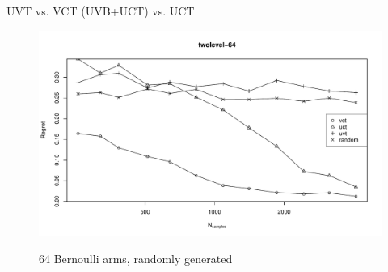 \documentclass{beamer}
\begin{document}
\begin{frame}{UVT vs. VCT (UVB+UCT) vs. UCT}
\begin{figure}[h]
\centering
\includegraphics[scale=0.45]{twolevel-64.pdf}

64 Bernoulli arms, randomly generated
\end{figure}
\end{frame}
\end{document}
